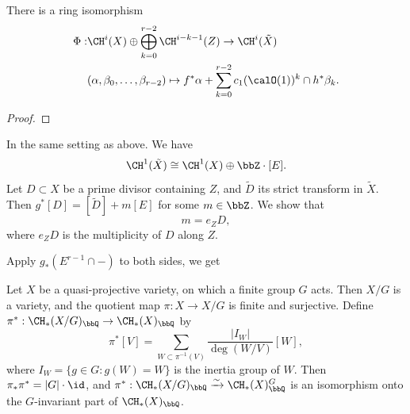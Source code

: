   \begin{theorem}
    There is a ring isomorphism 
    \begin{align*}
      \Phi: & \CH^i(X) \oplus \bigoplus_{k=0}^{r-2} \CH^{i-k-1}(Z) \to \CH^i(\tilde{X}) \\
      & (\alpha, \beta_0, \ldots, \beta_{r-2}) \mapsto f^* \alpha + \sum_{k=0}^{r-2} c_1(\calO(1))^k \cap h^* \beta_k. 
    \end{align*}
  \end{theorem}
  \begin{proof}
    

    \Yang{}
  \end{proof}

  \begin{example}
    In the same setting as above.
    We have 
    \[ \CH^1(\tilde{X}) \cong \CH^1(X) \oplus \bbZ \cdot [E]. \]
    Let $D \subset X$ be a prime divisor containing $Z$, and $\tilde{D}$ its strict transform in $\tilde{X}$.
    Then $g^* [D] = [\tilde{D}] + m [E]$ for some $m \in \bbZ$.
    We show that 
    \[ m = e_Z D, \]
    where $e_Z D$ is the multiplicity of $D$ along $Z$.

    Apply $g_*(E^{r-1} \cap -)$ to both sides, we get
    

    \Yang{}
  \end{example}


  \Yang{}


  Let $X$ be a quasi-projective variety, on which a finite group $G$ acts.
  Then $X/G$ is a variety, and the quotient map $\pi: X \to X/G$ is finite and surjective.
  Define $\pi^*: \CH_*(X/G)_\bbQ \to \CH_*(X)_\bbQ$ by 
  \[ \pi^* [V] = \sum_{W \subset \pi^{-1}(V)} \frac{|I_W|}{\deg (W/V)} [W], \]
  where $I_W = \{ g \in G : g(W) = W \}$ is the inertia group of $W$.
  Then $\pi_* \pi^* = |G| \cdot \id$, and $\pi^*: \CH_*(X/G)_\bbQ \xrightarrow{\sim} \CH_*(X)_\bbQ^G$ is an isomorphism onto the $G$-invariant part of $\CH_*(X)_\bbQ$.

  \Yang{}